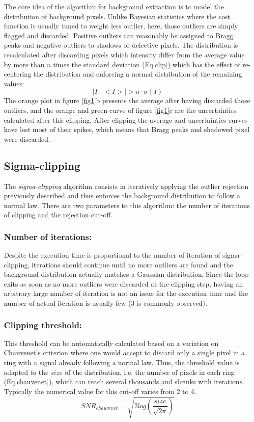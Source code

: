 \documentclass[preprint]{iucr}              %
\begin{document}
The core idea of the algorithm for background extraction is to model the distribution of background pixels. Unlike Bayesian statistics \cite{Sivia2006} where the cost function is usually tuned to weight less outlier, here, those outliers are simply flagged and discarded.
Positive outliers can reasonably be assigned to Bragg peaks and negative outliers to shadows or defective pixels. 
The distribution is recalculated  after discarding pixels which intensity differ from the average value by more than $n$ times the standard deviation (Eq\ref{clip}) which has the effect of re-centering the distribution and enforcing a normal distribution of the remaining values:
\begin{equation}
\label{clip}
|I - <I>| > n \cdot \sigma(I)
\end{equation}
The orange plot in figure \ref{fig1}b presents the average after having discarded those outliers, and the orange and green curve of figure \ref{fig1}c are the uncertainties calculated after this clipping. 
 After clipping the average and uncertainties curves have lost most of their spikes, which means that Bragg peaks and shadowed pixel were discarded.
 
\subsection{Sigma-clipping}
The \textit{sigma-clipping} algorithm consists in iteratively applying the outlier rejection previously described and thus enforces the background distribution to follow a normal law.
There are two parameters to this algorithm: the number of iterations of clipping and the rejection cut-off.

\subsubsection{Number of iterations:}
Despite the execution time is proportional to the number of iteration of sigma-clipping, iterations should continue until no more outliers are found and the 
background distribution actually matches a Gaussian distribution. 
Since the loop exits as soon as no more outliers were discarded at the clipping step, having an arbitrary large number of iteration is not an issue for the execution time and the number of actual iteration is usually few (3 is commonly observed).       

\subsubsection{Clipping threshold:}
This threshold can be automatically calculated based on a variation on Chauvenet's criterion \cite{chauvenet} where one would accept to discard only a single pixel in a ring with a signal already following a normal law. 
Thus, the threshold value is adapted to the $size$ of the distribution, i.e. the number of pixels in each ring (Eq\ref{chauvenet}), which can reach several thousands and shrinks with iterations.
Typically the numerical value for this cut-off varies from 2 to 4.   
\begin{equation}
\label{chauvenet}
SNR_{chauvenet} =  \sqrt{2 log(\frac{size}{\sqrt{2 \pi}})}
\end{equation}
\end{document}
